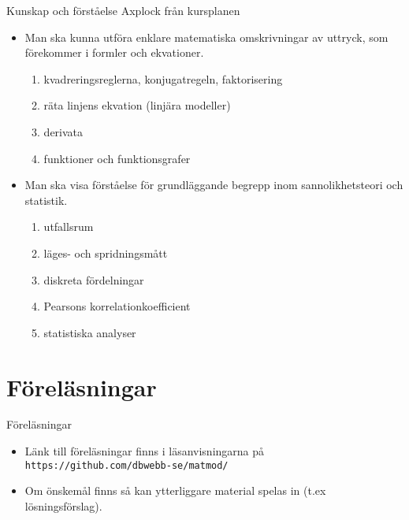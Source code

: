 \documentclass{beamer}
\begin{document}
\begin{frame}{Kunskap och förståelse}
  Axplock från kursplanen
  \begin{itemize}
  \item Man ska kunna utföra enklare matematiska omskrivningar
av uttryck, som förekommer i formler och
ekvationer.
\begin{enumerate}
\item kvadreringsreglerna, konjugatregeln, faktorisering
\item räta linjens ekvation (linjära modeller)
\item derivata
\item funktioner och funktionsgrafer
\end{enumerate}
\item Man ska visa förståelse för grundläggande begrepp inom sannolikhetsteori och statistik.
  \begin{enumerate}
  \item utfallsrum
  \item läges- och spridningsmått
  \item diskreta fördelningar
  \item Pearsons korrelationkoefficient
  \item statistiska analyser
  \end{enumerate}
\end{itemize}
\end{frame}





\section{Föreläsningar}
\begin{frame}{Föreläsningar}
  \begin{itemize}
  \item Länk till föreläsningar finns i läsanvisningarna på \texttt{https://github.com/dbwebb-se/matmod/}
  \item Om önskemål finns så kan ytterliggare material spelas in (t.ex
    lösningsförslag).
  \end{itemize}
\end{frame}
\end{document}
